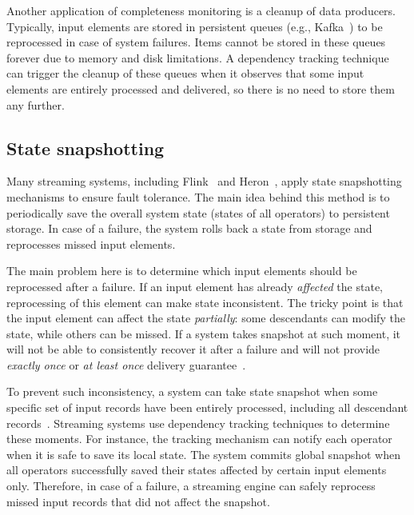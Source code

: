 Another application of completeness monitoring is a cleanup of data producers. Typically, input elements are stored in persistent queues (e.g., Kafka~\cite{kreps2011kafka}) to be reprocessed in case of system failures. Items cannot be stored in these queues forever due to memory and disk limitations. A dependency tracking technique can trigger the cleanup of these queues when it observes that some input elements are entirely processed and delivered, so there is no need to store them any further.

\subsection{State snapshotting}
Many streaming systems, including Flink~\cite{Carbone:2017:SMA:3137765.3137777} and Heron~\cite{Kulkarni:2015:THS:2723372.2742788}, apply state snapshotting mechanisms to ensure fault tolerance. The main idea behind this method is to periodically save the overall system state (states of all operators) to persistent storage. In case of a failure, the system rolls back a state from storage and reprocesses missed input elements. 

The main problem here is to determine which input elements should be reprocessed after a failure. If an input element has already {\em affected} the state, reprocessing of this element can make state inconsistent. The tricky point is that the input element can affect the state {\em partially}: some descendants can modify the state, while others can be missed. If a system takes snapshot at such moment, it will not be able to consistently recover it after a failure and will not provide {\em exactly once} or {\em at least once} delivery guarantee~\cite{2015arXiv150608603C, Carbone:2017:SMA:3137765.3137777}.

To prevent such inconsistency, a system can take state snapshot when some specific set of input records have been entirely processed, including all descendant records~\cite{2015arXiv150608603C, thepaper}. Streaming systems use dependency tracking techniques to determine these moments. For instance, the tracking mechanism can notify each operator when it is safe to save its local state. The system commits global snapshot when all operators successfully saved their states affected by certain input elements only. Therefore, in case of a failure, a streaming engine can safely reprocess missed input records that did not affect the snapshot.

